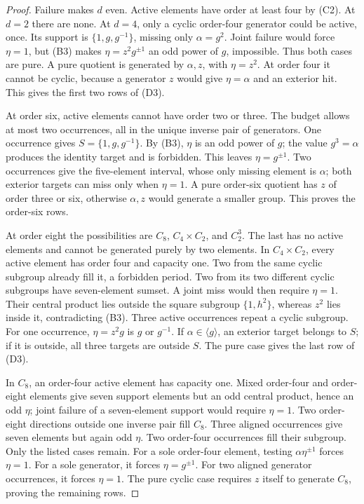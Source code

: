 \begin{proof}
Failure makes $d$ even. Active elements have order at least four by (C2).
At $d=2$ there are none. At $d=4$, only a cyclic order-four generator could
be active, once. Its support is $\{1,g,g^{-1}\}$, missing only
$\alpha=g^2$. Joint failure would force $\eta=1$, but (B3) makes
$\eta=z^2g^{\pm1}$ an odd power of $g$, impossible. Thus both cases are pure.
A pure quotient is generated by $\alpha,z$, with $\eta=z^2$.
At order four it cannot be cyclic, because a generator $z$ would give
$\eta=\alpha$ and an exterior hit. This gives the first two rows of (D3).

At order six, active elements cannot have order two or three. The budget
allows at most two occurrences, all in the unique inverse pair of generators.
One occurrence gives $S=\{1,g,g^{-1}\}$. By (B3), $\eta$ is an odd power
of $g$; the value $g^3=\alpha$ produces the identity target and is forbidden.
This leaves $\eta=g^{\pm1}$. Two occurrences give the five-element interval,
whose only missing element is $\alpha$; both exterior targets can miss only
when $\eta=1$. A pure order-six quotient has $z$ of order three or six,
otherwise $\alpha,z$ would generate a smaller group. This proves the order-six rows.

At order eight the possibilities are $C_8$, $C_4\times C_2$, and $C_2^3$.
The last has no active elements and cannot be generated purely by two elements.
In $C_4\times C_2$, every active element has order four and capacity one.
Two from the same cyclic subgroup already fill it, a forbidden period.
Two from its two different cyclic subgroups have seven-element sumset.
A joint miss would then require $\eta=1$. Their central product lies outside
the square subgroup $\{1,h^2\}$, whereas $z^2$ lies inside it, contradicting
(B3). Three active occurrences repeat a cyclic subgroup. For one occurrence,
$\eta=z^2g$ is $g$ or $g^{-1}$. If $\alpha\in\langle g\rangle$, an exterior
target belongs to $S$; if it is outside, all three targets are outside $S$.
The pure case gives the last row of (D3).

In $C_8$, an order-four active element has capacity one. Mixed order-four
and order-eight elements give seven support elements but an odd central
product, hence an odd $\eta$; joint failure of a seven-element support would
require $\eta=1$. Two order-eight directions outside one inverse pair fill
$C_8$. Three aligned occurrences give seven elements but again odd $\eta$.
Two order-four occurrences fill their subgroup. Only the listed cases remain.
For a sole order-four element, testing $\alpha\eta^{\pm1}$ forces $\eta=1$.
For a sole generator, it forces $\eta=g^{\pm1}$. For two aligned generator
occurrences, it forces $\eta=1$. The pure cyclic case requires $z$ itself
to generate $C_8$, proving the remaining rows.


\end{proof}
